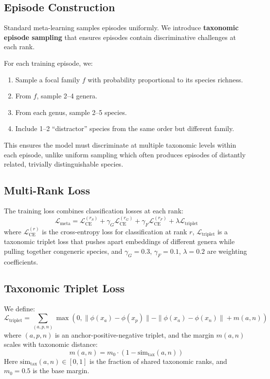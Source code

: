 \documentclass[11pt,a4paper]{article}
\newcommand{\Loss}{\mathcal{L}}
\begin{document}
\subsection{Episode Construction}

Standard meta-learning samples episodes uniformly. We introduce
\textbf{taxonomic episode sampling} that ensures episodes contain
discriminative challenges at each rank.

For each training episode, we:
\begin{enumerate}
  \item Sample a focal family $f$ with probability proportional to its
    species richness.
  \item From $f$, sample 2--4 genera.
  \item From each genus, sample 2--5 species.
  \item Include 1--2 ``distractor'' species from the same order but
    different family.
\end{enumerate}

This ensures the model must discriminate at multiple taxonomic levels
within each episode, unlike uniform sampling which often produces
episodes of distantly related, trivially distinguishable species.

\subsection{Multi-Rank Loss}

The training loss combines classification losses at each rank:
\begin{equation}
  \Loss_{\text{meta}} = \Loss_{\text{CE}}^{(r_S)} + \gamma_G
  \Loss_{\text{CE}}^{(r_G)} + \gamma_F \Loss_{\text{CE}}^{(r_F)}
  + \lambda \Loss_{\text{triplet}}
\end{equation}
where $\Loss_{\text{CE}}^{(r)}$ is the cross-entropy loss for
classification at rank $r$, $\Loss_{\text{triplet}}$ is a taxonomic
triplet loss that pushes apart embeddings of different genera while
pulling together congeneric species, and $\gamma_G = 0.3$, $\gamma_F =
0.1$, $\lambda = 0.2$ are weighting coefficients.

\subsection{Taxonomic Triplet Loss}

We define:
\begin{equation}
  \Loss_{\text{triplet}} = \sum_{(a, p, n)} \max(0,
  \|\phi(x_a) - \phi(x_p)\| - \|\phi(x_a) - \phi(x_n)\| + m(a, n))
\end{equation}
where $(a, p, n)$ is an anchor-positive-negative triplet, and the margin
$m(a, n)$ scales with taxonomic distance:
\begin{equation}
  m(a, n) = m_0 \cdot (1 - \text{sim}_{\text{tax}}(a, n))
\end{equation}
Here $\text{sim}_{\text{tax}}(a, n) \in [0, 1]$ is the fraction of
shared taxonomic ranks, and $m_0 = 0.5$ is the base margin.
\end{document}
